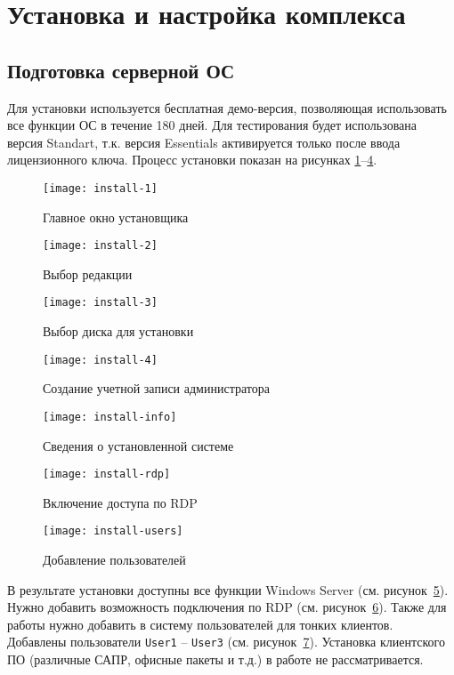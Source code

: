 \section{Установка и настройка комплекса}

\subsection{Подготовка серверной ОС}

Для установки используется бесплатная демо-версия, позволяющая использовать все функции
ОС в течение 180 дней. Для тестирования будет использована версия Standart, т.к.
версия Essentials активируется только после ввода лицензионного ключа. Процесс установки
показан на рисунках \ref{pic:install-1}–\ref{pic:install-4}.

\begin{figure}[p]
    \center
    \texttt{[image: install-1]}
    \caption{Главное окно установщика}
    \label{pic:install-1}
\end{figure}

\begin{figure}[p]
    \center
    \texttt{[image: install-2]}
    \caption{Выбор редакции}
    \label{pic:install-2}
\end{figure}

\begin{figure}[p]
    \center
    \texttt{[image: install-3]}
    \caption{Выбор диска для установки}
    \label{pic:install-3}
\end{figure}

\begin{figure}[p]
    \center
    \texttt{[image: install-4]}
    \caption{Создание учетной записи администратора}
    \label{pic:install-4}
\end{figure}

\begin{figure}[p]
    \center
    \texttt{[image: install-info]}
    \caption{Сведения о установленной системе}
    \label{pic:install-info}
\end{figure}

\begin{figure}[p]
    \center
    \texttt{[image: install-rdp]}
    \caption{Включение доступа по RDP}
    \label{pic:install-rdp}
\end{figure}

\begin{figure}[h]
    \center
    \texttt{[image: install-users]}
    \caption{Добавление пользователей}
    \label{pic:install-users}
\end{figure}

В результате установки доступны все функции Windows Server (см.
рисунок~\ref{pic:install-info}). Нужно добавить возможность подключения по RDP
(см. рисунок~\ref{pic:install-rdp}). Также для работы нужно добавить в систему пользователей
для тонких клиентов. Добавлены пользователи \texttt{User1} – \texttt{User3} (см.
рисунок~\ref{pic:install-users}). Установка клиентского ПО (различные САПР, офисные
пакеты и т.д.) в работе не рассматривается.
